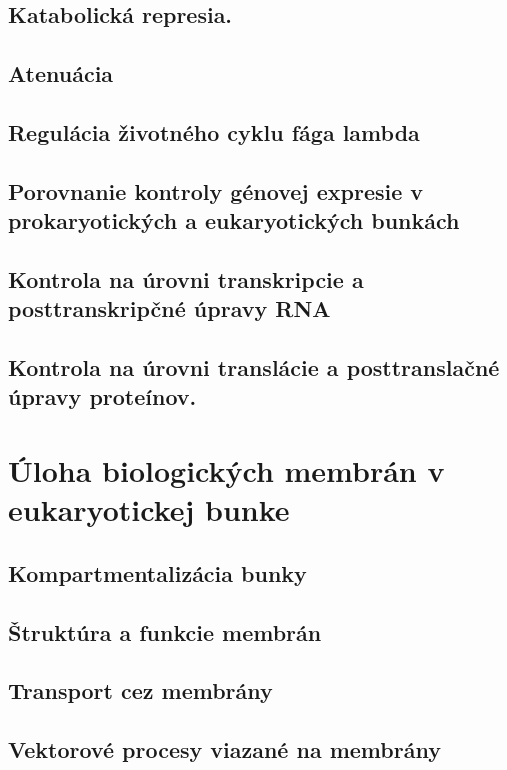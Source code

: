 \subsection{Katabolická represia.}

\subsection{Atenuácia}

\subsection{Regulácia životného cyklu fága lambda}

\subsection{Porovnanie kontroly génovej expresie v prokaryotických a eukaryotických bunkách}

\subsection{Kontrola na úrovni transkripcie a posttranskripčné úpravy RNA}

\subsection{Kontrola na úrovni translácie a posttranslačné úpravy proteínov.}

\section{Úloha biologických membrán v eukaryotickej bunke}

\subsection{Kompartmentalizácia bunky}

\subsection{Štruktúra a funkcie membrán}

\subsection{Transport cez membrány}

\subsection{Vektorové procesy viazané na membrány}

